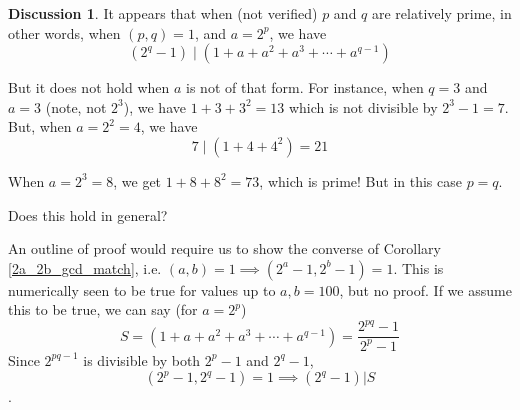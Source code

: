 \documentclass{article}
\theoremstyle{definition}
\newtheorem{discussion}{Discussion}[thm]
\begin{document}
\begin{discussion}
It appears that when (not verified) $p$ and $q$ are
relatively prime, in other words, when $(p,q) = 1$, and $a = 2^p$, we have
\[(2^q - 1) \mid (1 + a + a^2 + a^3 + \cdots + a^{q-1})\]

But it does not hold when $a$ is not of that form. For instance, when
$q = 3$ and $a = 3$ (note, not $2^3$), we have $1 + 3 + 3^2 = 13$ which
is not divisible by $2^3 - 1 = 7$. But, when $a = 2^2 = 4$, we have
\[7 \mid (1 + 4 + 4^2) = 21\]

When $a = 2^3 = 8$, we get $1 + 8 + 8^2 = 73$, which is prime! But in
this case $p = q$.

Does this hold in general?

An outline of proof would require us to show the converse of Corollary
\ref{2a_2b_gcd_match}, i.e.
$(a,b) = 1 \implies (2^a - 1,2^b-1) = 1$.
This is numerically seen to be true for values up to $a,b=100$, but no
proof. If we assume this to be true, we can say (for $a = 2^p$)
\[ S = (1 + a + a^2 + a^3 + \cdots + a^{q-1}) = \frac{2^{pq}-1}{2^p-1}\]
Since $2^{pq - 1}$ is divisible by both $2^p - 1$ and $2^q - 1$,
\[(2^p - 1,2^q-1) = 1 \implies (2^q - 1) | S\].

\end{discussion}
\end{document}
